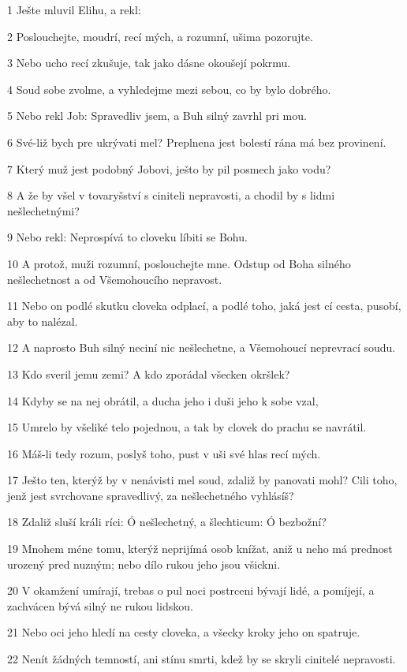 \par 1 Ješte mluvil Elihu, a rekl:
\par 2 Poslouchejte, moudrí, recí mých, a rozumní, ušima pozorujte.
\par 3 Nebo ucho recí zkušuje, tak jako dásne okoušejí pokrmu.
\par 4 Soud sobe zvolme, a vyhledejme mezi sebou, co by bylo dobrého.
\par 5 Nebo rekl Job: Spravedliv jsem, a Buh silný zavrhl pri mou.
\par 6 Své-liž bych pre ukrývati mel? Preplnena jest bolestí rána má bez provinení.
\par 7 Který muž jest podobný Jobovi, ješto by pil posmech jako vodu?
\par 8 A že by všel v tovaryšství s ciniteli nepravosti, a chodil by s lidmi nešlechetnými?
\par 9 Nebo rekl: Neprospívá to cloveku líbiti se Bohu.
\par 10 A protož, muži rozumní, poslouchejte mne. Odstup od Boha silného nešlechetnost a od Všemohoucího nepravost.
\par 11 Nebo on podlé skutku cloveka odplací, a podlé toho, jaká jest cí cesta, pusobí, aby to nalézal.
\par 12 A naprosto Buh silný neciní nic nešlechetne, a Všemohoucí neprevrací soudu.
\par 13 Kdo sveril jemu zemi? A kdo zporádal všecken okršlek?
\par 14 Kdyby se na nej obrátil, a ducha jeho i duši jeho k sobe vzal,
\par 15 Umrelo by všeliké telo pojednou, a tak by clovek do prachu se navrátil.
\par 16 Máš-li tedy rozum, poslyš toho, pust v uši své hlas recí mých.
\par 17 Ješto ten, kterýž by v nenávisti mel soud, zdaliž by panovati mohl? Cili toho, jenž jest svrchovane spravedlivý, za nešlechetného vyhlásíš?
\par 18 Zdaliž sluší králi ríci: Ó nešlechetný, a šlechticum: Ó bezbožní?
\par 19 Mnohem méne tomu, kterýž neprijímá osob knížat, aniž u neho má prednost urozený pred nuzným; nebo dílo rukou jeho jsou všickni.
\par 20 V okamžení umírají, trebas o pul noci postrceni bývají lidé, a pomíjejí, a zachvácen bývá silný ne rukou lidskou.
\par 21 Nebo oci jeho hledí na cesty cloveka, a všecky kroky jeho on spatruje.
\par 22 Nenít žádných temností, ani stínu smrti, kdež by se skryli cinitelé nepravosti.
